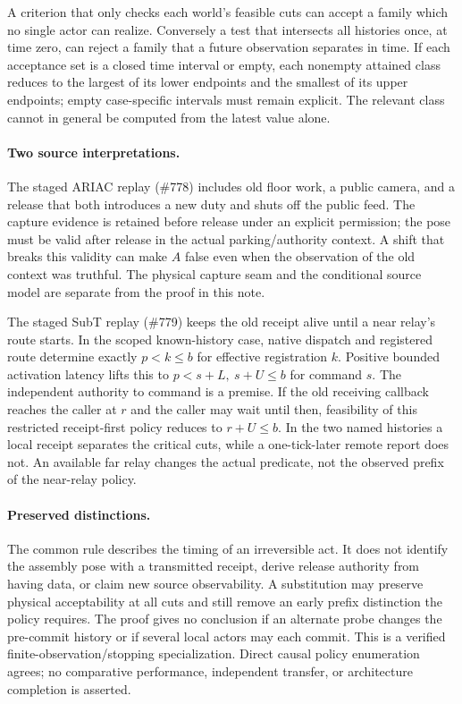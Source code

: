 \documentclass{article}
\begin{document}
A criterion that only checks each world's feasible cuts can
accept a family which no single actor can realize. Conversely a
test that intersects all histories once, at time zero, can
reject a family that a future observation separates in time.
If each acceptance set is a closed time interval or empty, each
nonempty attained class reduces to the largest of its lower
endpoints and the smallest of its upper endpoints; empty
case-specific intervals must remain explicit. The relevant class
cannot in general be computed from the latest value alone.

\paragraph{Two source interpretations.}
The staged ARIAC replay (\#778) includes old floor work, a
public camera, and a release that both introduces a new duty
and shuts off the public feed. The capture evidence is retained
before release under an explicit permission; the pose must be
valid after release in the actual parking/authority context.
A shift that breaks this validity can make \(A\) false even
when the observation of the old context was truthful. The
physical capture seam and the conditional source model are
separate from the proof in this note.

The staged SubT replay (\#779) keeps the old receipt alive
until a near relay's route starts. In the scoped known-history
case, native dispatch and registered route determine exactly
\(p<k\le b\) for effective registration \(k\).
Positive bounded activation latency lifts this to
\(p<s+L,\ s+U\le b\) for command \(s\).
The independent authority to command is a premise.
If the old receiving callback reaches the caller at \(r\) and
the caller may wait until then, feasibility of this restricted
receipt-first policy reduces to \(r+U\le b\).
In the two named histories a local receipt separates the
critical cuts, while a one-tick-later remote report does
not. An available far relay changes the actual predicate, not
the observed prefix of the near-relay policy.

\paragraph{Preserved distinctions.}
The common rule describes the timing of an irreversible act.
It does not identify the assembly pose with a transmitted
receipt, derive release authority from having data, or claim
new source observability. A substitution may preserve
physical acceptability at all cuts and still remove an early
prefix distinction the policy requires. The proof gives no
conclusion if an alternate probe changes the pre-commit
history or if several local actors may each commit. This is a
verified finite-observation/stopping specialization.
Direct causal policy enumeration agrees; no comparative
performance, independent transfer, or architecture completion
is asserted.
\end{document}
